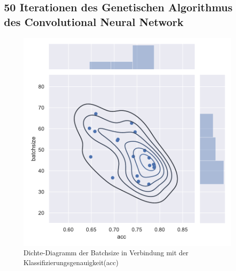 \subsection{50 Iterationen des Genetischen Algorithmus des Convolutional Neural Network}
\begin{figure}[H]
  \centering  
  \includegraphics[scale=0.5]{anhang/GA_50_cifar10_False_big_jointplot_batchsize.pdf}
  \caption{Dichte-Diagramm der Batchsize in Verbindung mit der Klassifizierungsgenauigkeit(acc)}
  
\end{figure}

